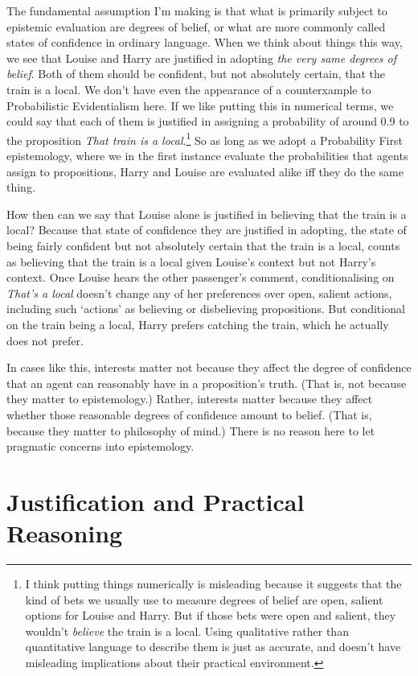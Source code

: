 \documentclass[
  10pt,
  letterpaper,
  DIV=11,
  numbers=noendperiod,
  twoside]{scrartcl}
\begin{document}
The fundamental assumption I'm making is that what is primarily subject
to epistemic evaluation are degrees of belief, or what are more commonly
called states of confidence in ordinary language. When we think about
things this way, we see that Louise and Harry are justified in adopting
\emph{the very same degrees of belief}. Both of them should be
confident, but not absolutely certain, that the train is a local. We
don't have even the appearance of a counterxample to Probabilistic
Evidentialism here. If we like putting this in numerical terms, we could
say that each of them is justified in assigning a probability of around
0.9 to the proposition \emph{That train is a local}.\footnote{I think
  putting things numerically is misleading because it suggests that the
  kind of bets we usually use to measure degrees of belief are open,
  salient options for Louise and Harry. But if those bets were open and
  salient, they wouldn't \emph{believe} the train is a local. Using
  qualitative rather than quantitative language to describe them is just
  as accurate, and doesn't have misleading implications about their
  practical environment.} So as long as we adopt a Probability First
epistemology, where we in the first instance evaluate the probabilities
that agents assign to propositions, Harry and Louise are evaluated alike
iff they do the same thing.

How then can we say that Louise alone is justified in believing that the
train is a local? Because that state of confidence they are justified in
adopting, the state of being fairly confident but not absolutely certain
that the train is a local, counts as believing that the train is a local
given Louise's context but not Harry's context. Once Louise hears the
other passenger's comment, conditionalising on \emph{That's a local}
doesn't change any of her preferences over open, salient actions,
including such `actions' as believing or disbelieving propositions. But
conditional on the train being a local, Harry prefers catching the
train, which he actually does not prefer.

In cases like this, interests matter not because they affect the degree
of confidence that an agent can reasonably have in a proposition's
truth. (That is, not because they matter to epistemology.) Rather,
interests matter because they affect whether those reasonable degrees of
confidence amount to belief. (That is, because they matter to philosophy
of mind.) There is no reason here to let pragmatic concerns into
epistemology.

\section{Justification and Practical
Reasoning}\label{justification-and-practical-reasoning}
\end{document}
